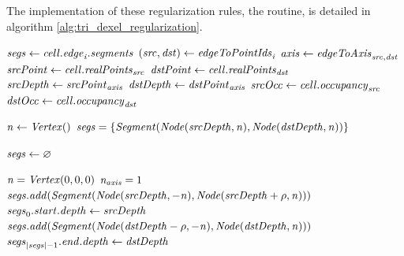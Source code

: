 The implementation of these regularization rules, \ie the  routine, is detailed in algorithm \ref{alg:tri_dexel_regularization}.
%
\begin{algorithm}
	\centering
	\begin{algorithmic}[1]
				\State $\mathit{segs} \gets \mathit{cell}.\mathit{edge}_{\mathit{i}}.\mathit{segments}$ 
				\label{alg:line:reg_vars_begin}
				\State $(\mathit{src}, \mathit{dst}) \gets \mathit{edgeToPointIds}_{\mathit{i}}$
				\State $\mathit{axis} \gets \mathit{edgeToAxis}_{\mathit{src}, \mathit{dst}}$
				\State $\mathit{srcPoint} \gets \mathit{cell}.\mathit{realPoints}_{\mathit{src}}$
				\State $\mathit{dstPoint} \gets \mathit{cell}.\mathit{realPoints}_{\mathit{dst}}$
				\State $\mathit{srcDepth} \gets \mathit{srcPoint}_{\mathit{axis}}$
				\State $\mathit{dstDepth} \gets \mathit{dstPoint}_{\mathit{axis}}$
				\State $\mathit{srcOcc} \gets \mathit{cell}.\mathit{occupancy}_{\mathit{src}}$
				\State $\mathit{dstOcc} \gets \mathit{cell}.\mathit{occupancy}_{\mathit{dst}}$
				\label{alg:line:reg_vars_end}

					\State $\mathit{n} \gets \mathit{Vertex}()$ 
					\State $\mathit{segs} = \{ \mathit{Segment}(\mathit{Node}(\mathit{srcDepth}, \mathit{n}), \mathit{Node}(\mathit{dstDepth}, \mathit{n})) \}$
				\EndIf

					\State $\mathit{segs} \gets \varnothing$
				\EndIf

				\State $\mathit{n} = \mathit{Vertex}(0, 0, 0)$
				\State $\mathit{n}_{\mathit{axis}} = 1$
						\State $\mathit{segs}.\mathit{add}(\mathit{Segment}(\mathit{Node}(\mathit{srcDepth}, -\mathit{n}), \mathit{Node}(\mathit{srcDepth} + \rho, \mathit{n})))$ %
						\State $\mathit{segs}_0.\mathit{start}.\mathit{depth} \gets \mathit{srcDepth}$
					\EndIf
				\EndIf
						\State $\mathit{segs}.\mathit{add}(\mathit{Segment}(\mathit{Node}(\mathit{dstDepth} - \rho, -\mathit{n}), \mathit{Node}(\mathit{dstDepth}, \mathit{n})))$
						\State $\mathit{segs}_{|\mathit{segs}| - 1}.\mathit{end}.\mathit{depth} \gets \mathit{dstDepth}$
					\EndIf
				\EndIf


\end{algorithmic}
\end{algorithm}
